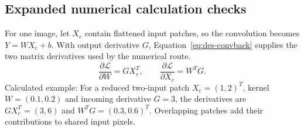 \begin{designalgorithm}
\caption{One numerical training batch and validation checkpoint decision~\cite{brauneevidence2026,braunepipeline2026}}
\label{alg:des-train}
\begin{designpseudo}
\end{designpseudo}
\end{designalgorithm}

\subsection{Expanded numerical calculation checks}\label{app:des-expanded-checks}

For one image, let $X_c$ contain flattened input patches, so the convolution becomes $Y=WX_c+b$. With output derivative $G$, Equation~\ref{eq:des-convback} supplies the two matrix derivatives used by the numerical route.
\begin{equation}
\frac{\partial\mathcal L}{\partial W}=GX_c^T,\qquad
\frac{\partial\mathcal L}{\partial X_c}=W^TG.
\label{eq:des-convback}
\end{equation}
Calculated example: For a reduced two-input patch $X_c=(1,2)^T$, kernel $W=(0.1,0.2)$ and incoming derivative $G=3$, the derivatives are $GX_c^T=(3,6)$ and $W^TG=(0.3,0.6)^T$. Overlapping patches add their contributions to shared input pixels. \cite[train.py, Conv2dBackward]{braunepipeline2026}

